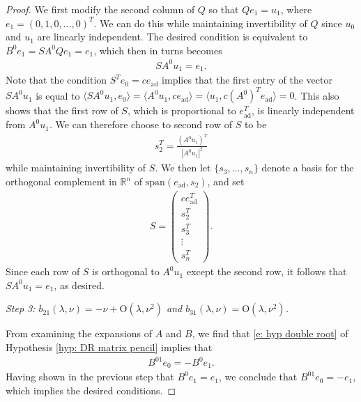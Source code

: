 \documentclass[11pt]{article}
\newcommand{\R}{\mathbb{R}}
\newcommand{\spn}{\text{\span}}
\numberwithin{equation}{section}
\numberwithin{prop}{section}
\renewcommand{\spn}{\mathrm{span}}
\newcommand{\bigo}{\mathrm{O}}
\begin{document}
\begin{proof}
	We first modify the second column of $Q$ so that $Q e_1 = u_1$, where $e_1 = (0, 1, 0, ..., 0)^T$. We can do this while maintaining invertibility of $Q$ since $u_0$ and $u_1$ are linearly independent. The desired condition is equivalent to $B^0 e_1 = S A^0 Q e_1 = e_1$, which then in turns becomes 
	\begin{align*}
	SA^0 u_1 = e_1. 
	\end{align*}
	Note that the condition $S^T e_0 = ce_\mathrm{ad}$ implies that the first entry of the vector $S A^0 u_1$ is equal to $\langle S A^0 u_1, e_0 \rangle = \langle A^0 u_1, c e_\mathrm{ad} \rangle = \langle u_1, c (A^0)^T e_\mathrm{ad} \rangle = 0$. This also shows that the first row of $S$, which is proportional to $e_\mathrm{ad}^T$, is linearly independent from $A^0 u_1$. We can therefore choose to second row of $S$ to be 
	\begin{align}
	s_2^T = \frac{(A^0 u_1)^T}{|A^0 u_1|^2} \label{e: s2 formula}
	\end{align}
	while maintaining invertibility of $S$. We then let $\{ s_3, ..., s_n \}$ denote a basis for the orthogonal complement in $\R^n$ of $\spn (e_\mathrm{ad}, s_2)$, and set 
	\begin{align}
	S = \begin{pmatrix}
	c e_\mathrm{ad}^T \\
	s_2^T \\
	s_3^T \\
	\vdots \\
	s_n^T
	\end{pmatrix}. 
	\end{align}
	Since each row of $S$ is orthogonal to $A^0 u_1$ except the second row, it follows that $S A^0 u_1 = e_1$, as desired.
	
	\emph{Step 3: $b_{21} (\lambda, \nu) = - \nu + \bigo(\lambda, \nu^2)$ and $b_{31}(\lambda, \nu) = \bigo (\lambda, \nu^2)$. } 
	
	From examining the expansions of $A$ and $B$, we find that \eqref{e: hyp double root} of Hypothesis \ref{hyp: DR matrix pencil} implies that 
	\begin{align*}
	B^{01} e_0 = - B^0 e_1. 
	\end{align*}
	Having shown in the previous step that $B^0 e_1 = e_1$, we conclude that $B^{01} e_0 = - e_1$, which implies the desired conditions. 
	

\end{proof}
\end{document}
